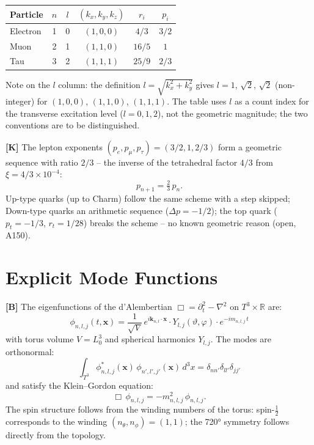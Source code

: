 \begin{center}
\renewcommand{\arraystretch}{1.3}
{\small
\begin{tabular}{lccccc}
\toprule
Particle & $n$ & $l$ & $(k_x,k_y,k_z)$ & $r_i$ & $p_i$ \\
\midrule
Electron & 1 & 0 & $(1,0,0)$ & $4/3$ & $3/2$ \\
Muon     & 2 & 1 & $(1,1,0)$ & $16/5$ & $1$ \\
Tau      & 3 & 2 & $(1,1,1)$ & $25/9$ & $2/3$ \\
\bottomrule
\end{tabular}
}
\renewcommand{\arraystretch}{1.0}
\end{center}
Note on the $l$ column: the definition $l=\sqrt{k_x^2+k_y^2}$ gives $l=1$, $\sqrt2$, $\sqrt2$ (non-integer) for $(1,0,0)$, $(1,1,0)$, $(1,1,1)$. The table uses $l$ as a count index for the transverse excitation level ($l=0,1,2$), not the geometric magnitude; the two conventions are to be distinguished.

\textbf{[K]} The lepton exponents $(p_e,p_\mu,p_\tau)=(3/2,1,2/3)$ form a
geometric sequence with ratio $2/3$ -- the inverse of the tetrahedral factor
$4/3$ from $\xi=4/3\times10^{-4}$:
\[
  p_{n+1} = \tfrac23\,p_n.
\]
Up-type quarks (up to Charm) follow the same scheme with a step skipped;
Down-type quarks an arithmetic sequence ($\Delta p=-1/2$); the top quark
($p_t=-1/3$, $r_t=1/28$) breaks the scheme -- no known geometric reason
(open, A150).

\section{Explicit Mode Functions}

\textbf{[B]} The eigenfunctions of the d'Alembertian $\Box=\partial_t^2-\nabla^2$
on $T^3\times\mathbb R$ are:
\[
  \boxed{\;
    \phi_{n,l,j}(t,\mathbf x)
    = \frac{1}{\sqrt V}\,
      e^{i\mathbf k_{n,l}\cdot\mathbf x}\cdot
      Y_{l,j}(\vartheta,\varphi)\cdot
      e^{-im_{n,l,j}\,t}
  \;}
\]
with torus volume $V=L_0^3$ and spherical harmonics $Y_{l,j}$. The modes are
orthonormal:
\[
  \int_{T^3}\phi_{n,l,j}^*(\mathbf x)\,\phi_{n',l',j'}(\mathbf x)\,d^3x
  = \delta_{nn'}\delta_{ll'}\delta_{jj'}
\]
and satisfy the Klein--Gordon equation:
\[
  \Box\,\phi_{n,l,j} = -m_{n,l,j}^2\,\phi_{n,l,j}.
\]
The spin structure follows from the winding numbers of the torus: spin-$\tfrac12$
corresponds to the winding $(n_\theta,n_\phi)=(1,1)$; the 720° symmetry follows
directly from the topology.

